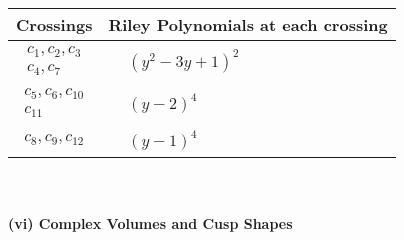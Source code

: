 \documentclass[1p]{elsarticle_modified}
\theoremstyle{definition}
\begin{document}
\begin{tabular}{m{50pt}|m{274pt}}
Crossings & \hspace{64pt}Riley Polynomials at each crossing \\
\hline $$\begin{aligned}c_{1},c_{2},c_{3}\\c_{4},c_{7}\end{aligned}$$&$\begin{aligned}
&(y^2-3 y+1)^2
\end{aligned}$\\
\hline $$\begin{aligned}c_{5},c_{6},c_{10}\\c_{11}\end{aligned}$$&$\begin{aligned}
&(y-2)^4
\end{aligned}$\\
\hline $$\begin{aligned}c_{8},c_{9},c_{12}\end{aligned}$$&$\begin{aligned}
&(y-1)^4
\end{aligned}$\\
\hline
\end{tabular}\\~\\
\newpage\flushleft \textbf{(vi) Complex Volumes and Cusp Shapes}
\end{document}
